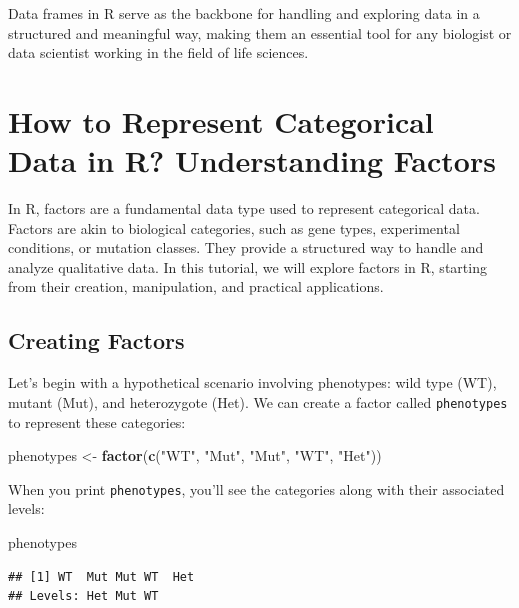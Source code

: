 \documentclass[
]{book}
\newenvironment{Shaded}{\begin{snugshade}}{\end{snugshade}}
\newcommand{\FunctionTok}[1]{\textcolor[rgb]{0.13,0.29,0.53}{\textbf{#1}}}
\newcommand{\NormalTok}[1]{#1}
\newcommand{\OtherTok}[1]{\textcolor[rgb]{0.56,0.35,0.01}{#1}}
\newcommand{\StringTok}[1]{\textcolor[rgb]{0.31,0.60,0.02}{#1}}
\begin{document}
Data frames in R serve as the backbone for handling and exploring data in a structured and meaningful way, making them an essential tool for any biologist or data scientist working in the field of life sciences.

\hypertarget{how-to-represent-categorical-data-in-r-understanding-factors}{%
\section{How to Represent Categorical Data in R? Understanding Factors}\label{how-to-represent-categorical-data-in-r-understanding-factors}}

In R, factors are a fundamental data type used to represent categorical data. Factors are akin to biological categories, such as gene types, experimental conditions, or mutation classes. They provide a structured way to handle and analyze qualitative data. In this tutorial, we will explore factors in R, starting from their creation, manipulation, and practical applications.

\hypertarget{creating-factors}{%
\subsection{Creating Factors}\label{creating-factors}}

Let's begin with a hypothetical scenario involving phenotypes: wild type (WT), mutant (Mut), and heterozygote (Het). We can create a factor called \texttt{phenotypes} to represent these categories:

\begin{Shaded}
\begin{Highlighting}[]
\NormalTok{phenotypes }\OtherTok{\textless{}{-}} \FunctionTok{factor}\NormalTok{(}\FunctionTok{c}\NormalTok{(}\StringTok{"WT"}\NormalTok{, }\StringTok{"Mut"}\NormalTok{, }\StringTok{"Mut"}\NormalTok{, }\StringTok{"WT"}\NormalTok{, }\StringTok{"Het"}\NormalTok{))}
\end{Highlighting}
\end{Shaded}

When you print \texttt{phenotypes}, you'll see the categories along with their associated levels:

\begin{Shaded}
\begin{Highlighting}[]
\NormalTok{phenotypes}
\end{Highlighting}
\end{Shaded}

\begin{verbatim}
## [1] WT  Mut Mut WT  Het
## Levels: Het Mut WT
\end{verbatim}
\end{document}
